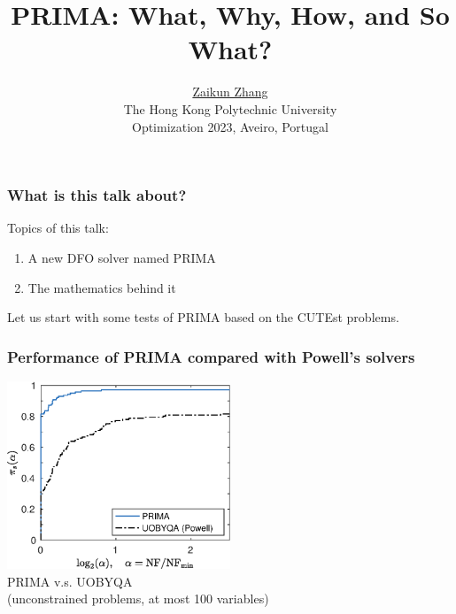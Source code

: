 \documentclass[slidestop,mathserif,xcolor=dvipsnames]{beamer}
\title[\insertsection]
{PRIMA: What, Why, How, and So What?}
\author[]{
  {\href{https://www.zhangzk.net}{Zaikun Zhang}}
  \\[2ex]{\small The Hong Kong Polytechnic University}\\[3ex]
    {
        Optimization 2023, Aveiro, Portugal
        \\[9ex]
    }%
	}
\date{}
\begin{document}
\begin{frame}[plain]
  \titlepage
\end{frame}

\begin{frame}
    \frametitle{What is this talk about?}

    \vspace{10ex}
    Topics of this talk:
    \vspace{2ex}
    \begin{enumerate}
        \item A new DFO solver named PRIMA
            \vspace{2ex}
        \item The mathematics behind it
    \end{enumerate}

    \vspace{2ex}
    Let us start with some tests of PRIMA based on the CUTEst problems.
\end{frame}


\begin{frame}
    \frametitle{Performance of PRIMA compared with Powell's solvers}
    \vspace{3ex}
    \begin{center}
    \includegraphics[width=0.5\textwidth]{prima_uobyqa.eps}
    \\[2ex]PRIMA v.s. UOBYQA \\[1ex](unconstrained problems, at most 100 variables)
    \end{center}
\end{frame}
\end{document}
